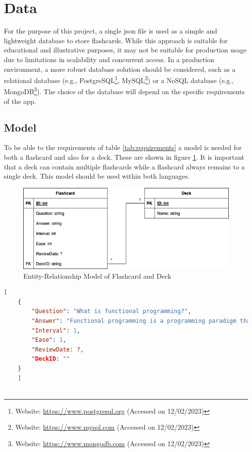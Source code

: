     \section{Data}
    For the purpose of this project, a single \ac{json} file is used as a simple and lightweight database to store flashcards. While this approach is suitable for educational and illustrative purposes, it may not be suitable for production usage due to limitations in scalability and concurrent access. In a production environment, a more robust database solution should be considered, such as a relational database (e.g., PostgreSQL\footnote{Website: \url{https://www.postgresql.org} (Accessed on 12/02/2023)}, MySQL\footnote{Website: \url{https://www.mysql.com} (Accessed on 12/02/2023)}) or a NoSQL database (e.g., MongoDB\footnote{Website: \url{https://www.mongodb.com} (Accessed on 12/02/2023)}). The choice of the database will depend on the specific requirements of the \ac{app}.

    \subsection{Model}
    To be able to the requirements of table \ref{tab:requirements} a model is needed for both a flashcard and also for a deck. These are shown in figure \ref{fig:er-model}. It is important that a deck can contain multiple flashcards while a flashcard always remains to a single deck. This model should be used within both languages.

    \begin{figure}
        \centering
        \includegraphics[width=1\textwidth]{NerddeckModel.png}
        \caption{Entity-Relationship Model of Flashcard and Deck}
        \label{fig:er-model}
    \end{figure}

    \begin{lstlisting}[language=json,firstnumber=1,float=tp, caption={Example of how a flashcard is saved inside a \ac{json} file}, label=l:flashcardjson]
    [
    {
        "Question": "What is functional programming?",
        "Answer": "Functional programming is a programming paradigm that treats computation as the evaluation of mathematical functions and avoids changing-state and mutable data.",
        "Interval": 1,
        "Ease": 1,
        "ReviewDate: ?,
        "DeckID: ""
    }
    ]
        
    \end{lstlisting}


